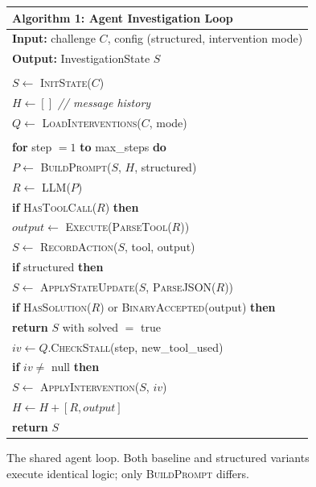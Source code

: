\documentclass[letterpaper]{article}
\begin{document}
\begin{figure}[t]
\centering
\small
\begin{tabular}{l}
\toprule
\textbf{Algorithm 1:} Agent Investigation Loop \\
\midrule
\textbf{Input:} challenge $C$, config (structured, intervention mode) \\
\textbf{Output:} InvestigationState $S$ \\
\\
$S \leftarrow$ \textsc{InitState}($C$) \\
$H \leftarrow []$ \hfill \textit{// message history} \\
$Q \leftarrow$ \textsc{LoadInterventions}($C$, mode) \\
\\
\textbf{for} step $= 1$ \textbf{to} max\_steps \textbf{do} \\
\quad $P \leftarrow$ \textsc{BuildPrompt}($S$, $H$, structured) \\
\quad $R \leftarrow$ \textsc{LLM}($P$) \\
\quad \textbf{if} \textsc{HasToolCall}($R$) \textbf{then} \\
\quad\quad $output \leftarrow$ \textsc{Execute}(\textsc{ParseTool}($R$)) \\
\quad\quad $S \leftarrow$ \textsc{RecordAction}($S$, tool, output) \\
\quad \textbf{if} structured \textbf{then} \\
\quad\quad $S \leftarrow$ \textsc{ApplyStateUpdate}($S$, \textsc{ParseJSON}($R$)) \\
\quad \textbf{if} \textsc{HasSolution}($R$) or \textsc{BinaryAccepted}(output) \textbf{then} \\
\quad\quad \textbf{return} $S$ with solved $= $ true \\
\quad $iv \leftarrow Q$.\textsc{CheckStall}(step, new\_tool\_used) \\
\quad \textbf{if} $iv \neq$ null \textbf{then} \\
\quad\quad $S \leftarrow$ \textsc{ApplyIntervention}($S$, $iv$) \\
\quad $H \leftarrow H + [R, output]$ \\
\textbf{return} $S$ \\
\bottomrule
\end{tabular}
\caption{The shared agent loop. Both baseline and structured variants execute identical logic; only \textsc{BuildPrompt} differs.}
\label{alg:loop}
\end{figure}
\end{document}
